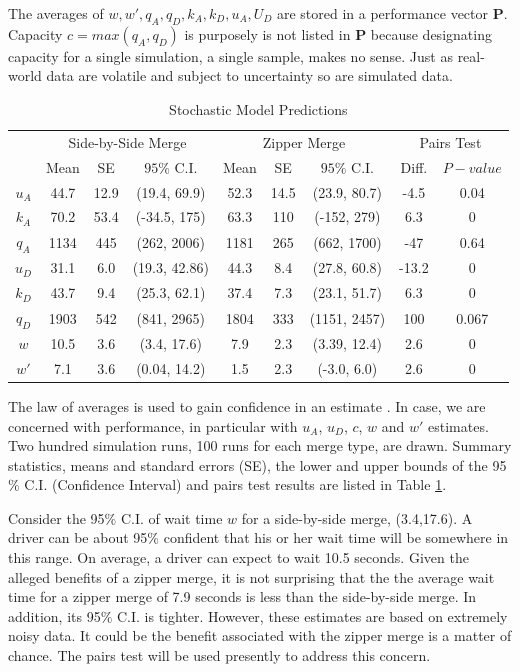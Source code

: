 \documentclass[Proceedings]{ascelike}
\begin{document}
The averages of $w, w', q_A, q_D, k_A, k_D, u_A, U_D$ are stored in a performance vector $\mathbf{P}$. Capacity $c = max(q_A,q_D)$ is purposely is not listed in $\mathbf{P}$ because designating capacity for a single simulation, a single sample, makes no sense. Just as real-world data are volatile and subject to uncertainty so are simulated data. 
\begin{table}
\caption{Stochastic Model Predictions}
\centering
\small
\begin{tabular}{|c|ccc|ccc|cc|}
 \hline
 \hline
&\multicolumn{3}{c|}{Side-by-Side Merge}&\multicolumn{3}{c|}{Zipper Merge}&\multicolumn{2}{c|}{Pairs Test}\\
 & Mean & SE & $95\%$ C.I. & Mean & SE & $95\%$ C.I. &  Diff. & $P-value$\\
\hline
$u_A$  & 44.7& 12.9&(19.4,  69.9) & 52.3& 14.5& (23.9, 80.7) &-4.5 & 0.04\\
$k_A$  & 70.2& 53.4& (-34.5,  175)& 63.3& 110 & (-152, 279)& 6.3 &0\\
$q_A$  & 1134& 445& (262, 2006)& 1181& 265 & (662, 1700)& -47 & 0.64\\
\hline
$u_D$  & 31.1& 6.0& (19.3, 42.86) & 44.3& 8.4&(27.8, 60.8)&-13.2 & 0\\
$k_D$  & 43.7& 9.4& (25.3, 62.1)&37.4& 7.3 & (23.1, 51.7)&6.3 & 0\\
$q_D$  & 1903& 542& (841, 2965)& 1804& 333 & (1151, 2457)&100 & 0.067\\
\hline
$w$     & 10.5 & 3.6 & (3.4, 17.6)& 7.9 & 2.3 & (3.39, 12.4)& 2.6 & 0 \\
$w'$     & 7.1 & 3.6 & (0.04, 14.2)& 1.5 & 2.3 & (-3.0, 6.0)& 2.6 & 0 \\
\hline
\hline
\end{tabular}
\label{tab:tab2}
\normalsize
\end{table}

The law of averages  is used to gain confidence in an estimate \cite{freedman}. In case, we are concerned with performance, in particular with $u_A$, $u_D$, $c$, $w$ and $w'$ estimates.  Two hundred  simulation runs, 100 runs for each merge type, are drawn. Summary statistics, means and standard errors (SE), the lower and upper bounds of the 95$\%$ C.I. (Confidence Interval) and pairs test results are  listed in Table \ref{tab:tab2}. 

Consider the 95$\%$ C.I.  of wait time $w$ for a side-by-side merge, (3.4,17.6). A driver can be about 95$\%$ confident that his or her wait time will be somewhere in this range. On average, a driver can expect to wait 10.5 seconds. Given the alleged benefits of a zipper merge, it is not surprising that the the average wait time for a zipper merge of 7.9 seconds is less than the side-by-side merge. In addition, its  95$\%$ C.I. is tighter. However, these estimates are based on extremely noisy data. It could be the benefit associated with the zipper merge is a matter of chance. The pairs test will be used presently to address this concern. 
\end{document}
